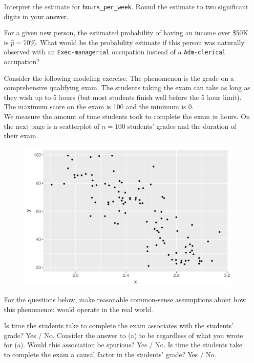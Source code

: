 \documentclass[12pt]{article}
\begin{document}
  Interpret the estimate for \texttt{hours\_per\_week}. Round the estimate to two significant digits in your answer. 


 For a given new person, the estimated probability of having an income over \$50K is $\hat{p} = 70\%$. What would be the probability estimate if this person was naturally observed with an \texttt{Exec-managerial} occupation instead of a \texttt{Adm-clerical} occupation? 


\eenum



\problem Consider the following modeling exercise. The phenomenon is the grade on a comprehensive qualifying exam. The students taking the exam can take as long as they wish up to 5 hours (but most students finish well before the 5 hour limit). The maximum score on the exam is 100 and the minimum is 0. \\

We measure the amount of time students took to complete the exam in hours. On the next page is a scatterplot of $n=100$ students' grades and the duration of their exam.

\begin{figure}[h]
\centering\includegraphics[width=6in]{time_and_grade}
\end{figure}

For the questions below, make reasonable common-sense assumptions about how this phenomenon would operate in the real world.

\benum

 Is time the students take to complete the exam associates with the students' grade? Yes / No.
 Consider the answer to (a) to be  regardless of what you wrote for (a). Would this association be spurious? Yes / No.
 Is time the students take to complete the exam a causal factor in the students' grade? Yes / No.
\end{document}
